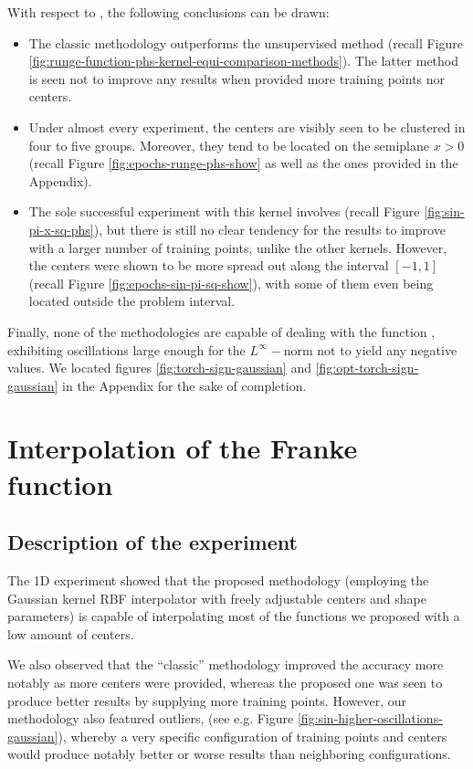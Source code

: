 \documentclass[12pt]{report} %
\newcommand{\tmverbatim}[1]{\text{{\ttfamily{#1}}}}
\begin{document}
With respect to \tmverbatim{phs\_kernel}, the following conclusions can be
drawn:
\begin{itemize}
  \item The classic methodology outperforms the unsupervised method (recall
  Figure \ref{fig:runge-function-phs-kernel-equi-comparison-methods}). The
  latter method is seen not to improve any results when provided more training
  points nor centers.
  
  \item Under almost every experiment, the centers are visibly seen to be
  clustered in four to five groups. Moreover, they tend to be located on the
  semiplane $x > 0$ (recall Figure \ref{fig:epochs-runge-phs-show} as well as
  the ones provided in the Appendix).
  
  \item The sole successful experiment with this kernel involves
  \tmverbatim{sin\_pi\_x\_sq} (recall Figure \ref{fig:sin-pi-x-sq-phs}), but
  there is still no clear tendency for the results to improve with a larger
  number of training points, unlike the other kernels. However, the centers
  were shown to be more spread out along the interval $[- 1, 1]$ (recall
  Figure \ref{fig:epochs-sin-pi-sq-show}), with some of them even being
  located outside the problem interval.
\end{itemize}
Finally, none of the methodologies are capable of dealing with the function
\tmverbatim{torch\_sign}, exhibiting oscillations large enough for the
$L^{\infty} -$norm not to yield any negative values. We located figures
\ref{fig:torch-sign-gaussian} and \ref{fig:opt-torch-sign-gaussian} in the
Appendix for the sake of completion.

\section{Interpolation of the Franke function}
\label{section:interpolation-of-franke}

\subsection*{Description of the experiment}

The 1D experiment showed that the proposed methodology (employing the Gaussian 
kernel RBF interpolator with freely adjustable centers and shape parameters) is 
capable of interpolating most of the functions we proposed with a low amount of 
centers. 

We also observed that the ``classic'' methodology improved the accuracy
more notably as more centers were provided,
whereas the proposed one was seen to produce better results by supplying more 
training points. However, our methodology also featured outliers,
(see e.g. Figure \ref{fig:sin-higher-oscillations-gaussian}), 
whereby a very specific configuration of training points and centers would 
produce notably better or worse results than neighboring configurations. 
\end{document}
